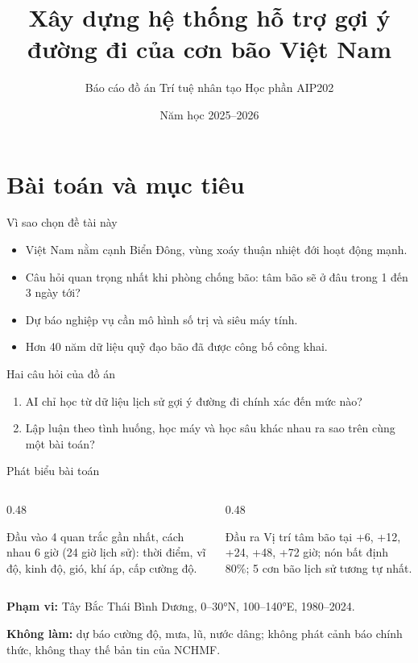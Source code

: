 \documentclass[aspectratio=169, 11pt]{beamer}
\title[Gợi ý đường đi của bão]{Xây dựng hệ thống hỗ trợ gợi ý\\ đường đi của cơn bão Việt Nam}
\subtitle{Báo cáo đồ án Trí tuệ nhân tạo \textperiodcentered{} Học phần AIP202}
\author[Nhóm \lop]{\sinhvien}
\institute[DAU]{Khoa Công nghệ Thông tin, Trường Đại học Kiến trúc Đà Nẵng\\[2pt]
  Giảng viên hướng dẫn: \gvhd}
\date{Năm học 2025--2026}
\begin{document}
\begin{frame}[plain]
  \titlepage
\end{frame}

\section{Bài toán và mục tiêu}

\begin{frame}{Vì sao chọn đề tài này}
  \begin{itemize}
    \item Việt Nam nằm cạnh Biển Đông, vùng xoáy thuận nhiệt đới hoạt động mạnh.
    \item Câu hỏi quan trọng nhất khi phòng chống bão:
          \alert{tâm bão sẽ ở đâu trong 1 đến 3 ngày tới?}
    \item Dự báo nghiệp vụ cần mô hình số trị và siêu máy tính.
    \item Hơn 40 năm dữ liệu quỹ đạo bão đã được công bố công khai.
  \end{itemize}
  \vspace{0.6em}
  \begin{block}{Hai câu hỏi của đồ án}
    \begin{enumerate}
      \item AI chỉ học từ dữ liệu lịch sử gợi ý đường đi chính xác đến mức nào?
      \item Lập luận theo tình huống, học máy và học sâu khác nhau ra sao trên
            cùng một bài toán?
    \end{enumerate}
  \end{block}
\end{frame}

\begin{frame}{Phát biểu bài toán}
  \begin{columns}[T]
    \begin{column}{0.48\textwidth}
      \begin{block}{Đầu vào}
        4 quan trắc gần nhất, cách nhau 6 giờ (24 giờ lịch sử): thời điểm,
        vĩ độ, kinh độ, gió, khí áp, cấp cường độ.
      \end{block}
    \end{column}
    \begin{column}{0.48\textwidth}
      \begin{block}{Đầu ra}
        Vị trí tâm bão tại +6, +12, +24, +48, +72 giờ; nón bất định 80\%;
        5 cơn bão lịch sử tương tự nhất.
      \end{block}
    \end{column}
  \end{columns}
  \vspace{0.8em}
  \textbf{Phạm vi:} Tây Bắc Thái Bình Dương, 0--30°N, 100--140°E, 1980--2024.

  \textbf{Không làm:} dự báo cường độ, mưa, lũ, nước dâng; không phát cảnh báo
  chính thức, không thay thế bản tin của NCHMF.
\end{frame}
\end{document}
